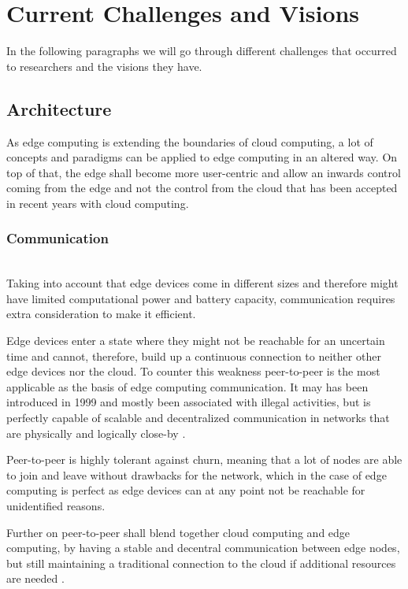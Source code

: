 \section{Current Challenges and Visions}\label{sec:main}
In the following paragraphs we will go through different challenges that occurred to researchers and the visions they have.

\subsection{Architecture}
As edge computing is extending the boundaries of cloud computing, a lot of concepts and paradigms can be applied to edge computing in an altered way. On top of that, the edge shall become more user-centric and allow an inwards control coming from the edge and not the control from the cloud that has been accepted in recent years with cloud computing.

\subsubsection{Communication}\hspace*{\fill} \\
Taking into account that edge devices come in different sizes and therefore might have limited computational power and battery capacity, communication requires extra consideration to make it efficient.

Edge devices enter a state where they might not be reachable for an uncertain time and cannot, therefore, build up a continuous connection to neither other edge devices nor the cloud.
To counter this weakness peer-to-peer is the most applicable as the basis of edge computing communication. It may has been introduced in 1999 and mostly been associated with illegal activities, but is perfectly capable of scalable and decentralized communication in networks that are physically and logically close-by \cite{GarciaLopez:2015:ECV:2831347.2831354}.

Peer-to-peer is highly tolerant against churn, meaning that a lot of nodes are able to join and leave without drawbacks for the network, which in the case of edge computing is perfect as edge devices can at any point not be reachable for unidentified reasons.

Further on peer-to-peer shall blend together cloud computing and edge computing, by having a stable and decentral communication between edge nodes, but still maintaining a traditional connection to the cloud if additional resources are needed \cite{GarciaLopez:2015:ECV:2831347.2831354}.

